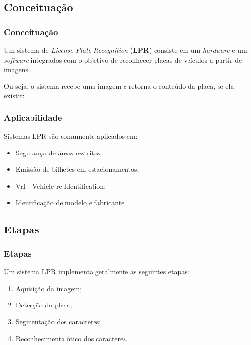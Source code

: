 \subsection[Subsection]{Conceituação}
\begin{frame}
	\frametitle{Conceituação}
	Um sistema de \emph{License Plate Recognition} (\textbf{LPR}) 
	consiste em um \emph{hardware} e um \emph{software}
	integrados com o objetivo de reconhecer placas de veículos 
	a partir de imagens \cite{Anagnostopoulos2014}.

	\vspace{1em}

	Ou seja, o sistema recebe uma imagem e
	retorna o conteúdo da placa, se ela existir:

	\vspace{1em}
	
	\begin{center}	
	\end{center}
\end{frame}

\begin{frame}
	\frametitle{Aplicabilidade}
	Sistemas LPR são comumente aplicados em:
	\begin{itemize}
		\item Segurança de áreas restritas;
		\item Emissão de bilhetes em estacionamentos;
		\item VrI - Vehicle re-Identification;
		\item Identificação de modelo e fabricante.
	\end{itemize}
\end{frame}

\subsection[Subsection]{Etapas}
\begin{frame}
	\frametitle{Etapas}
	Um sistema LPR implementa geralmente as seguintes etapas:

	\begin{enumerate}
		\item Aquisição da imagem;
		\item Detecção da placa;
		\item Segmentação dos caracteres;
		\item Reconhecimento ótico dos caracteres.
	\end{enumerate}
\end{frame}

